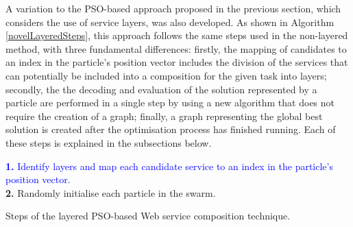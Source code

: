 \documentclass{llncs}
\begin{document}
A variation to the PSO-based approach proposed in the previous section, which considers the use of service layers, was also developed. As shown in Algorithm \ref{novelLayeredSteps}, this approach follows the same steps used in the non-layered method, with three fundamental differences: firstly, the mapping of candidates to an index in the particle's position vector includes the division of the services that can potentially be included into a composition for the given task into layers; secondly, the the decoding and evaluation of the solution represented by a particle are performed in a single step by using a new algorithm that does not require the creation of a graph; finally, a graph representing the global best solution is created after the optimisation process has finished running. Each of these steps is explained in the subsections below.

\begin{algorithm}[h]
 \setlength{}
 \let\oldnl\nl%
\newcommand{\nonl}{\renewcommand{\nl}{\let\nl\oldnl}}
 \LinesNumbered
 	\textcolor{blue}{\textbf{1.} Identify layers and map each candidate service to an index in the particle's position vector.}\\
	\textbf{2.} Randomly initialise each particle in the swarm.\\
	\nonl {}
	
 \caption{Steps of the layered PSO-based Web service composition technique.}
\label{novelLayeredSteps}
\end{algorithm}
\end{document}

